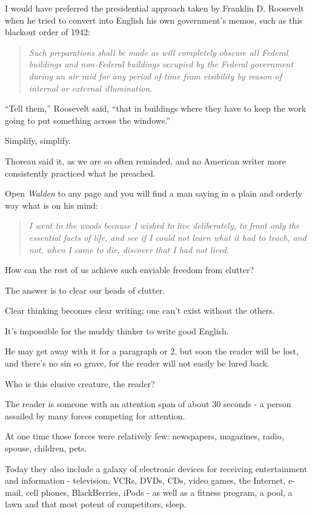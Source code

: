\documentclass{book}
\numberwithin{equation}{section}
\begin{document}
I would have preferred the presidential approach taken by Franklin D. Roosevelt when he tried to convert into English his own government's memos, such as this blackout order of 1942:
\begin{quotation}
    \textit{Such preparations shall be made as will completely obscure all Federal buildings and non-Federal buildings occupied by the Federal government during an air raid for any period of time from visibility by reason of internal or external illumination}.
\end{quotation}
``Tell them,'' Roosevelt said, ``that in buildings where they have to keep the work going to put something across the windows.''

%
Simplify, simplify.

Thoreau said it, as we are so often reminded, and no American writer more consistently practiced what he preached.

Open \textit{Walden} to any page and you will find a man saying in a plain and orderly way what is on his mind:
\begin{quotation}
    \textit{I went to the woods because I wished to live deliberately, to front only the essential facts of life, and see if I could not learn what it had to teach, and not, when I came to die, discover that I had not lived}.
\end{quotation}
How can the rest of us achieve such enviable freedom from clutter?

The answer is to clear our heads of clutter.

Clear thinking becomes clear writing; one can't exist without the others.

It's impossible for the muddy thinker to write good English.

He may get away with it for a paragraph or 2, but soon the reader will be lost, and there's no sin so grave, for the reader will not easily be lured back.

%
Who is this elusive creature, the reader?

The reader is someone with an attention span of about 30 seconds - a person assailed by many forces competing for attention.

At one time those forces were relatively few: newspapers, magazines, radio, spouse, children, pets.

Today they also include a galaxy of electronic devices for receiving entertainment and information - television, VCRs, DVDs, CDs, video games, the Internet, e-mail, cell phones, BlackBerries, iPods - as well as a fitness program, a pool, a lawn and that most potent of competitors, sleep.
\end{document}
